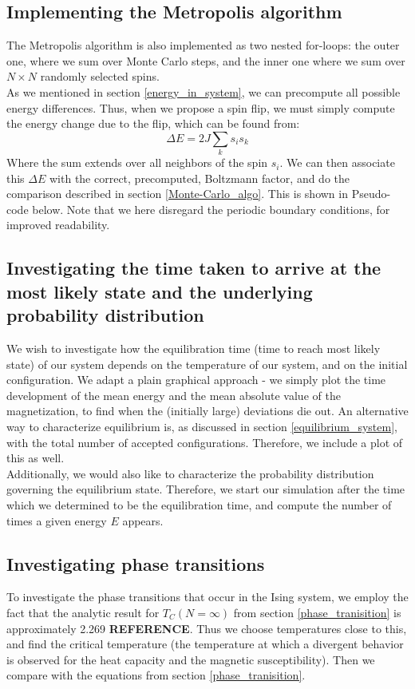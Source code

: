 \documentclass[a4paper, 10pt]{article}
\begin{document}
\subsection{Implementing the Metropolis algorithm}\label{metropolis_algo_implementation}
The Metropolis algorithm is also implemented as two nested for-loops: the outer one, where we sum over Monte Carlo steps, and the inner one where we sum over $N\times N$ randomly selected spins.\\
\linebreak
As we mentioned in section \ref{energy_in_system}, we can precompute all possible energy differences. Thus, when we propose a spin flip, we must simply compute the energy change due to the flip, which can be found from:
$$\Delta E = 2J\sum_k s_is_k$$
Where the sum extends over all neighbors of the spin $s_i$. We can then associate this $\Delta E$ with the correct, precomputed, Boltzmann factor, and do the comparison described in section \ref{Monte-Carlo_algo}.  This is shown in Pseudo-code below. Note that we here disregard the periodic boundary conditions, for improved readability. 

\subsection{Investigating the time taken to arrive at the most likely state and the underlying probability distribution}
We wish to investigate how the equilibration time (time to reach most likely state) of our system depends on the temperature of our system, and on the initial configuration. We adapt a plain graphical approach - we simply plot the time development of the mean energy and the mean absolute value of the magnetization, to find when the (initially large) deviations die out. An alternative way to characterize equilibrium is, as discussed in section \ref{equilibrium_system}, with the total number of accepted configurations. Therefore, we include a plot of this as well.\\
\linebreak
Additionally, we would also like to characterize the probability distribution governing the equilibrium state. Therefore, we start our simulation after the time which we determined to be the equilibration time, and compute the number of times a given energy $E$ appears.
\subsection{Investigating phase transitions}
To investigate the phase transitions that occur in the Ising system, we employ the fact that the analytic result for $T_C(N=\infty)$ from section \ref{phase_tranisition} is approximately 2.269 \textbf{REFERENCE}. Thus we choose temperatures close to this, and find the critical temperature (the temperature at which a divergent behavior is observed for the heat capacity and the magnetic susceptibility). Then we compare with the equations from section \ref{phase_tranisition}.
\end{document}
